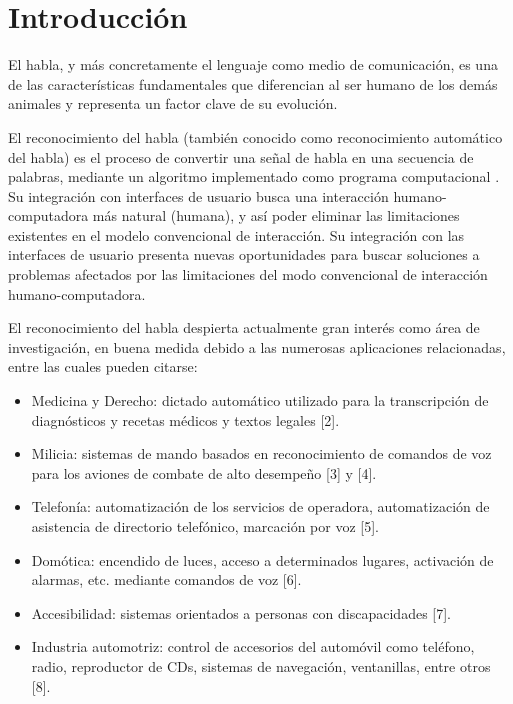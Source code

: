 \section{Introducci\'{o}n}
\label{sec:intro}

El habla, y m\'{a}s concretamente el lenguaje como medio de comunicaci\'{o}n, es una de las 
caracter\'{i}sticas fundamentales 
que diferencian al ser humano de los dem\'{a}s animales y representa un factor clave de su evoluci\'{o}n. 

El reconocimiento del habla (tambi\'{e}n conocido como reconocimiento autom\'{a}tico del habla) 
es el proceso de convertir
una se\~{n}al de habla en una secuencia de palabras, mediante un algoritmo implementado como 
programa computacional \citet{JaisalAReview2012}. Su integraci\'{o}n con interfaces de usuario busca una interacci\'{o}n 
humano-computadora m\'{a}s natural (humana), y as\'{i} poder eliminar las limitaciones existentes
en el modelo convencional de interacci\'{o}n. Su integraci\'{o}n con las 
interfaces de usuario presenta nuevas oportunidades para buscar soluciones a problemas afectados por las 
limitaciones del modo convencional de interacci\'{o}n humano-computadora.

El reconocimiento del habla despierta actualmente gran inter\'{e}s como \'{a}rea de investigaci\'{o}n, 
en buena medida debido a las numerosas aplicaciones relacionadas, entre las cuales pueden citarse:

\begin{itemize}
    \item Medicina y Derecho: dictado autom\'{a}tico utilizado para la transcripci\'{o}n de 
    diagn\'{o}sticos y recetas m\'{e}dicos y textos legales [2].

    \item Milicia: sistemas de mando basados en reconocimiento de comandos de voz para los aviones 
    de combate de alto desempeño [3] y [4].

    \item Telefon\'{i}a: automatizaci\'{o}n de los servicios de operadora, automatizaci\'{o}n de 
    asistencia de directorio telef\'{o}nico, marcaci\'{o}n por voz [5].

    \item Dom\'{o}tica: encendido de luces, acceso a determinados lugares, activaci\'{o}n de alarmas, etc. 
    mediante comandos de voz [6].

    \item Accesibilidad: sistemas orientados a personas con discapacidades [7].

    \item Industria automotriz: control de accesorios del autom\'{o}vil como tel\'{e}fono, radio, 
    reproductor de CDs, sistemas de navegaci\'{o}n, ventanillas, entre otros [8].
\end{itemize}


